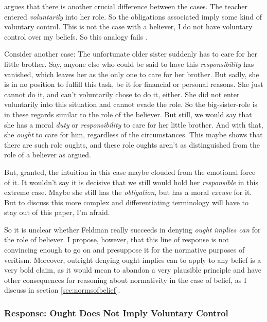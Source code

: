 \documentclass[12pt,numbers=noenddot]{scrartcl}
\begin{document}
\textcite[686]{Peels2014-PEEADC} argues that there is another crucial difference between the cases. The teacher entered \emph{voluntarily} into her role. So the obligations associated imply some kind of voluntary control. This is not the case with a believer, I do not have voluntary control over my beliefs. So this analogy fails \autocite[687]{Peels2014-PEEADC}.

Consider another case: The unfortunate older sister suddenly has to care for her little brother. Say, anyone else who could be said to have this \emph{responsibility} has vanished, which leaves her as the only one to care for her brother. But sadly, she is in no position to fulfill this task, be it for financial or personal reasons. She just cannot do it, and can't voluntarily chose to do it, either. She did not enter voluntarily into this situation and cannot evade the role. So the big-sister-role is in these regards similar to the role of the believer. But still, we would say that she has a moral \emph{duty} or \emph{responsibility} to care for her little brother. And with that, she \emph{ought} to care for him, regardless of the circumstances. This maybe shows that there are such role oughts, and these role oughts aren't as distinguished from the role of a believer as argued.

But, granted, the intuition in this case maybe clouded from the emotional force of it. It wouldn't say it is decisive that we still would hold her \emph{responsible} in this extreme case. Maybe she still has the \emph{obligation}, but has a moral \emph{excuse} for it. But to discuss this more complex and differentiating terminology will have to stay out of this paper, I'm afraid.

So it is unclear whether Feldman really succeeds in denying \emph{ought implies can} for the role of believer. I propose, however, that this line of response is not convincing enough to go on and presuppose it for the normative purposes of veritism. Moreover, outright denying ought implies can to apply to any belief is a very bold claim, as it would mean to abandon a very plausible principle and have other consequences for reasoning about normativity in the case of belief, as I discuss in section \ref{sec:normsofbelief}.

\subsubsection{Response: Ought Does Not Imply Voluntary Control}\label{sec:oughtdoesnot}
\end{document}
